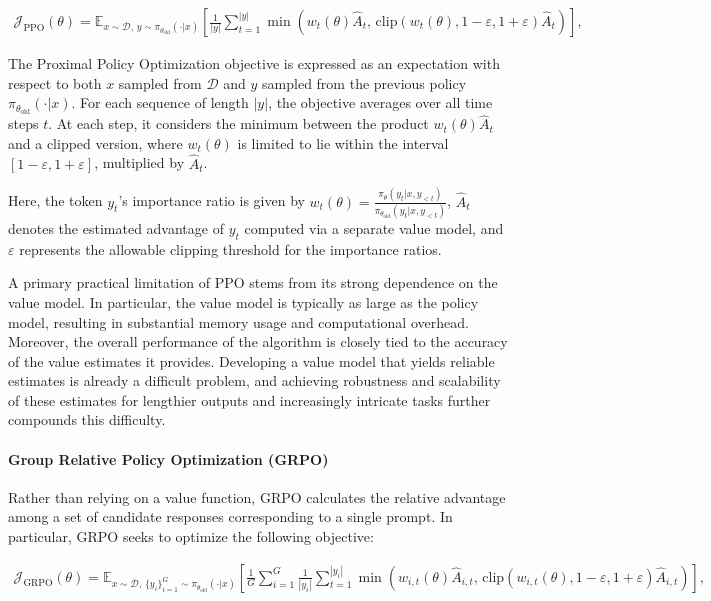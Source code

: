 \begin{align}
\mathcal{J}_\text{PPO}(\theta) = \mathbb{E}_{ x \sim \mathcal{D},\, y \sim \pi_{\theta_\text{old}}( \cdot | x) }
\left[ \frac{1}{|y|} \sum_{t=1}^{|y|}
\min \left( w_{t}(\theta) \widehat{A}_{t},  \, \mathrm{clip} \left( w_{t}(\theta), 1 - {\varepsilon}, 1 + {\varepsilon}\right) \widehat{A}_{t} \right)
\right],
\end{align}

The Proximal Policy Optimization objective is expressed as an expectation with respect to both $x$ sampled from $\mathcal{D}$ and $y$ sampled from the previous policy $\pi_{\theta_\text{old}}( \cdot | x)$. For each sequence of length $|y|$, the objective averages over all time steps $t$. At each step, it considers the minimum between the product $w_{t}(\theta) \widehat{A}_{t}$ and a clipped version, where $w_{t}(\theta)$ is limited to lie within the interval $[1 - \varepsilon, 1 + \varepsilon]$, multiplied by $\widehat{A}_{t}$.

Here, the token $y_t$'s importance ratio is given by $
w_{t}(\theta) = \frac{ \pi_{\theta} (y_{t} | x, y_{<t}) }{ \pi_{\theta_\text{old}} (y_{t} | x,y_{<t})} $, $\widehat{A}_{t}$ denotes the estimated advantage of $y_t$ computed via a separate value model, and $\varepsilon$ represents the allowable clipping threshold for the importance ratios.

A primary practical limitation of PPO stems from its strong dependence on the value model. In particular, the value model is typically as large as the policy model, resulting in substantial memory usage and computational overhead. Moreover, the overall performance of the algorithm is closely tied to the accuracy of the value estimates it provides. Developing a value model that yields reliable estimates is already a difficult problem, and achieving robustness and scalability of these estimates for lengthier outputs and increasingly intricate tasks further compounds this difficulty.

\paragraph{Group Relative Policy Optimization (GRPO)} Rather than relying on a value function, GRPO \citep{grpo} calculates the relative advantage among a set of candidate responses corresponding to a single prompt. In particular, GRPO seeks to optimize the following objective:

\begin{align}
\label{equ:grpo}
\mathcal{J}_\text{GRPO}(\theta) = \mathbb{E}_{ x \sim \mathcal{D},\, \{y_i\}_{i=1}^G \sim \pi_{\theta_\text{old}}( \cdot | x) }
\left[ \frac{1}{G} \sum_{i=1}^{G} \frac{1}{|y_i|} \sum_{t=1}^{|y_i|} 
\min \left( w_{i,t}(\theta) \widehat{A}_{i,t}, \, \mathrm{clip} \left( w_{i,t}(\theta), 1 - \varepsilon, 1 + \varepsilon\right) \widehat{A}_{i,t} \right)
\right],
\end{align}

